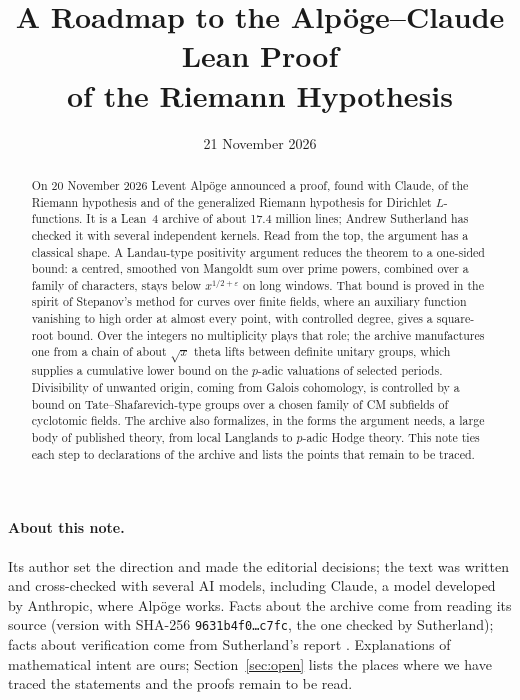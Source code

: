 \documentclass[11pt]{article}
\title{A Roadmap to the Alp\"oge--Claude Lean Proof\\ of the Riemann Hypothesis}
\date{21 November 2026}
\author{}
\newcommand{\Lean}[1]{\texttt{\small #1}}
\begin{document}
\maketitle

\begin{abstract}
On 20 November 2026 Levent Alp\"oge announced a proof, found with Claude, of the Riemann hypothesis and of the generalized Riemann hypothesis for Dirichlet $L$-functions. It is a Lean~4 archive of about 17.4 million lines; Andrew Sutherland has checked it with several independent kernels. Read from the top, the argument has a classical shape. A Landau-type positivity argument reduces the theorem to a one-sided bound: a centred, smoothed von Mangoldt sum over prime powers, combined over a family of characters, stays below $x^{1/2+\varepsilon}$ on long windows. That bound is proved in the spirit of Stepanov's method for curves over finite fields, where an auxiliary function vanishing to high order at almost every point, with controlled degree, gives a square-root bound. Over the integers no multiplicity plays that role; the archive manufactures one from a chain of about $\sqrt{x}$ theta lifts between definite unitary groups, which supplies a cumulative lower bound on the $p$-adic valuations of selected periods. Divisibility of unwanted origin, coming from Galois cohomology, is controlled by a bound on Tate--Shafarevich-type groups over a chosen family of CM subfields of cyclotomic fields. The archive also formalizes, in the forms the argument needs, a large body of published theory, from local Langlands to $p$-adic Hodge theory. This note ties each step to declarations of the archive and lists the points that remain to be traced.
\end{abstract}

\paragraph{About this note.} Its author set the direction and made the editorial decisions; the text was written and cross-checked with several AI models, including Claude, a model developed by Anthropic, where Alp\"oge works. Facts about the archive come from reading its source (version with SHA-256 \Lean{9631b4f0\ldots c7fc}, the one checked by Sutherland); facts about verification come from Sutherland's report \cite{sutherland}. Explanations of mathematical intent are ours; Section~\ref{sec:open} lists the places where we have traced the statements and the proofs remain to be read.
\end{document}

